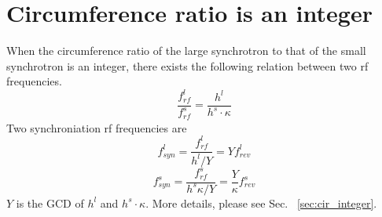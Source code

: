 %
%
% 
%
\section{Circumference ratio is an integer}
\label{sec:integ}
When the circumference ratio of the large synchrotron to that of the small synchrotron is an integer, there exists the following relation between two rf frequencies. 
\begin{equation}
\frac{f_{\mathit{rf}}^{l}}{f_{\mathit{rf}}^{s}}= \frac{h^l}{h^s \cdot \kappa}
\end{equation}
Two synchroniation rf frequencies are
\begin{equation}
f_{\mathit{syn}}^{l}=\frac{f_{\mathit{rf}}^{l}}{h^{l}/Y}=Y f_{\mathit{rev}}^{l} \label{synch_freq1_r}
\end{equation}
\begin{equation}
f_{\mathit{syn}}^{s}=\frac{f_{\mathit{rf}}^{s}}{h^{s}\kappa/Y}=\frac{Y}{\kappa} f_{\mathit{rev}}^{s} \label{synch_freq2_r}
\end{equation}
$Y$ is the \gls{GCD} of $h^l$ and $h^s \cdot \kappa$. More details, please see Sec. ~\ref{sec:cir_integer}.

